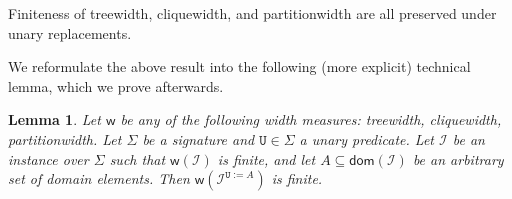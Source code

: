 \documentclass[10pt,a4paper]{amsart}
\theoremstyle{definition}
\numberwithin{equation}{section}
\theoremstyle{plain}
\newtheorem{lemma}[lemma]{Lemma}
\theoremstyle{definition}
\theoremstyle{myexample}
\theoremstyle{plain}
\newenvironment{customobs}[1]
  {\renewcommand\theinnercustomobs{#1}\innercustomobs}
  {\endinnercustomobs}
\theoremstyle{definition}
\newcommand{\signature}{\Sigma}
\newcommand{\instance}{\mathcal{I}}
\newcommand{\inst}{\instance}
\newcommand{\adom}[1]{\fcn{dom}(#1)}
\newcommand{\cols}{\mathbb{L}}
\newcommand{\ercwidth}{\partitionwidth}
\newcommand{\hypercliquewidth}{\partitionwidth}
\newcommand{\partitionwidth}{par\-ti\-tion\-width}
\newcommand{\fcn}[1]{\mathsf{#1}}
\newcommand{\pred}[1]{\mathtt{#1}}
\begin{document}
\newcommand{\cwdec}{\mathrm{Dec}(\cols, \mathrm{Cnst}, \Sigma)}
\newcommand{\hcwdec}{\mathrm{Dec}(\cols, \mathrm{Cnst})}
\newcommand{\wdt}{\mathcal{T}}

\begin{customobs}{\ref{prop:unary-replacements}}
Finiteness of treewidth, cliquewidth, and \hypercliquewidth{} are all preserved under unary replacements.
\end{customobs}

We reformulate the above result into the following (more explicit) technical lemma, which we prove afterwards.

\begin{lemma}
Let $\fcn{w}$ be any of the following width measures: treewidth, cliquewidth, \ercwidth{}. Let $\signature$ be a signature and $\pred{U} \in \signature$ a unary predicate. Let $\inst$ be an instance over $\signature$ such that $\fcn{w}(\inst)$ is finite, and let $A \subseteq \adom{\inst}$ be an arbitrary set of domain elements. Then $\fcn{w}(\inst^{\pred{U}:=A})$ is finite.
\end{lemma}
\end{document}
